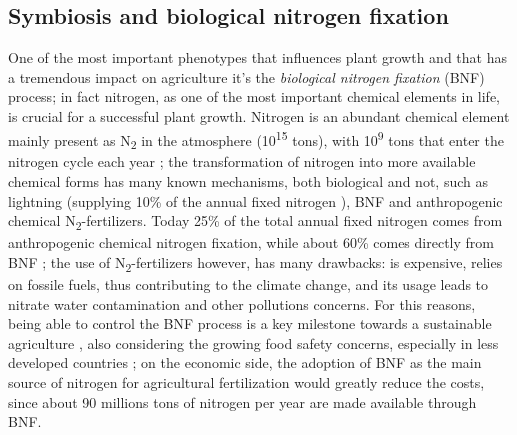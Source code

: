\subsection{Symbiosis and biological nitrogen fixation}
One of the most important phenotypes that influences plant growth and that has a tremendous impact on agriculture it's the \textit{biological nitrogen fixation} (BNF) process; in fact nitrogen, as one of the most important chemical elements in life, is crucial for a successful plant growth. Nitrogen is an abundant chemical element mainly present as N\textsubscript{2} in the atmosphere (10\textsuperscript{15} tons), with 10\textsuperscript{9} tons that enter the nitrogen cycle each year \cite{postgate1982fundamentals}; the transformation of nitrogen into more available chemical forms has many known mechanisms, both biological and not, such as lightning (supplying 10\% of the annual fixed nitrogen \cite{sprent1990nitrogen}), BNF and anthropogenic chemical N\textsubscript{2}-fertilizers. Today 25\% of the total annual fixed nitrogen comes from anthropogenic chemical nitrogen fixation, while about 60\% comes directly from BNF \cite{peoples1995biological}; the use of N\textsubscript{2}-fertilizers however, has many drawbacks: is expensive, relies on fossile fuels, thus contributing to the climate change, and its usage leads to nitrate water contamination and other pollutions concerns. For this reasons, being able to control the BNF process is a key milestone towards a sustainable agriculture \cite{stewart1966nitrogen}, also considering the growing food safety concerns, especially in less developed countries \cite{n2africa}; on the economic side, the adoption of BNF as the main source of nitrogen for agricultural fertilization would greatly reduce the costs, since about 90 millions tons of nitrogen per year are made available through BNF. 


